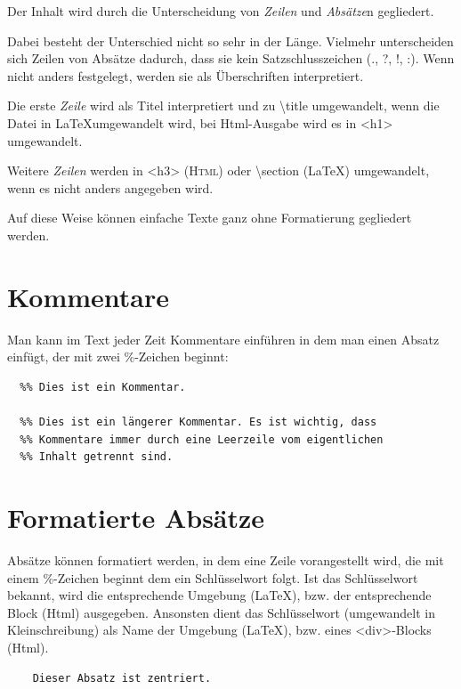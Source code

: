 \documentclass{scrartcl}
\begin{document}
Der Inhalt wird durch die Unterscheidung von  \emph{Zeilen} und
\emph{Absätze}n gegliedert.

Dabei besteht der Unterschied nicht so sehr in der
Länge. Vielmehr unterscheiden sich Zeilen von Absätze
dadurch, dass sie kein Satzschlusszeichen (., ?, !, :).
Wenn nicht anders festgelegt, werden sie als Überschriften
interpretiert.

Die erste \emph{Zeile} wird als Titel interpretiert und zu \textbackslash title
umgewandelt, wenn die Datei in \LaTeX umgewandelt wird, bei
Html-Ausgabe wird es in <h1> umgewandelt.

Weitere \emph{Zeilen} werden in <h3> (\textsc{Html}) oder \textbackslash section
(LaTeX) umgewandelt, wenn es nicht anders angegeben wird.

Auf diese Weise können einfache Texte ganz ohne Formatierung
gegliedert werden.

\section{Kommentare}

Man kann im Text jeder Zeit Kommentare einführen in dem man einen Absatz einfügt, der mit zwei \%-Zeichen beginnt:

\begin{verbatim}
  %% Dies ist ein Kommentar.

  %% Dies ist ein längerer Kommentar. Es ist wichtig, dass
  %% Kommentare immer durch eine Leerzeile vom eigentlichen
  %% Inhalt getrennt sind.

\end{verbatim}



\section{Formatierte Absätze}

Absätze können formatiert werden, in dem eine Zeile
vorangestellt wird, die mit einem \%-Zeichen beginnt dem ein
Schlüsselwort folgt. Ist das Schlüsselwort bekannt, wird
die entsprechende Umgebung (LaTeX), bzw. der entsprechende
Block (Html) ausgegeben. Ansonsten dient das Schlüsselwort
(umgewandelt in Kleinschreibung) als Name der Umgebung
(LaTeX), bzw. eines <div>-Blocks (Html).

\begin{verbatim}
	Dieser Absatz ist zentriert.

\end{verbatim}
\end{document}
